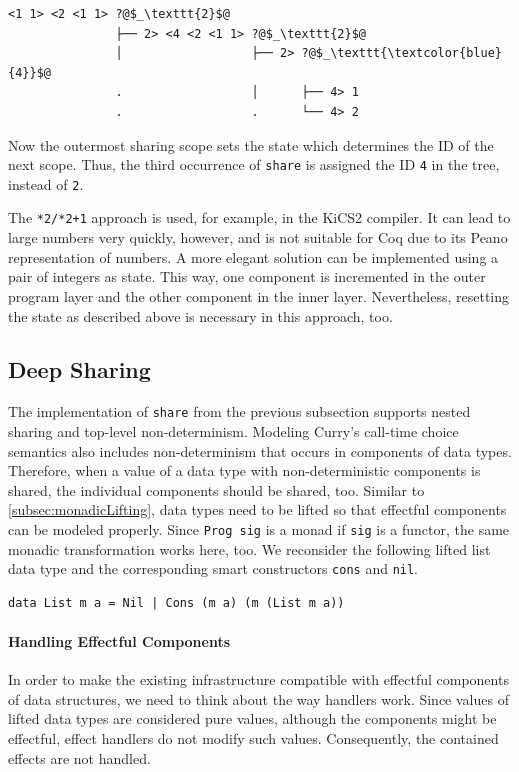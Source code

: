 \documentclass[a4paper, 11pt, fleqn, twoside, abstract=on]{scrreprt}
\newcommand{\hinl}[1]{\texttt{#1}}
\begin{document}
\begin{verbatim}
<1 1> <2 <1 1> ?@$_\texttt{2}$@  
               ├── 2> <4 <2 <1 1> ?@$_\texttt{2}$@  
               │                  ├── 2> ?@$_\texttt{\textcolor{blue}{4}}$@
               .                  │      ├── 4> 1
               .                  .      └── 4> 2
\end{verbatim}

Now the outermost sharing scope sets the state which determines the ID of the next scope.
Thus, the third occurrence of \hinl{share} is assigned the ID \hinl{4} in the tree, instead of \hinl{2}.

The \hinl{*2/*2+1} approach is used, for example, in the KiCS2 compiler.
It can lead to large numbers very quickly, however, and is not suitable for Coq due to its Peano representation of numbers.
A more elegant solution can be implemented using a pair of integers as state.
This way, one component is incremented in the outer program layer and the other component in the inner layer.
Nevertheless, resetting the state as described above is necessary in this approach, too. 

\subsection{Deep Sharing}
\label{subsec:deepSharing}
The implementation of \hinl{share} from the previous subsection supports nested sharing and top-level non-determinism.
Modeling Curry's call-time choice semantics also includes non-determinism that occurs in components of data types.
Therefore, when a value of a data type with non-deterministic components is shared, the individual components should be shared, too.
Similar to \autoref{subsec:monadicLifting}, data types need to be lifted so that effectful components can be modeled properly.
Since \hinl{Prog sig} is a monad if \hinl{sig} is a functor, the same monadic transformation works here, too.
We reconsider the following lifted list data type and the corresponding smart constructors \hinl{cons} and \hinl{nil}.

\begin{verbatim}
data List m a = Nil | Cons (m a) (m (List m a))
\end{verbatim}

\paragraph{Handling Effectful Components}
In order to make the existing infrastructure compatible with effectful components of data structures, we need to think about the way handlers work.
Since values of lifted data types are considered pure values, although the components might be effectful, effect handlers do not modify such values.
Consequently, the contained effects are not handled.
\end{document}
